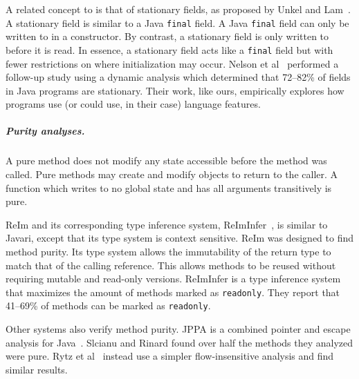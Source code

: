 A related concept to \const{} is that of stationary fields, as proposed by Unkel
and Lam~\cite{popl-2008-p183-unkel}.
A stationary field is similar to a Java \texttt{final} field.
A Java \texttt{final} field can only be written to in a constructor.
By contrast, a stationary field is only written to before it is read.
In essence, a stationary field acts like a \texttt{final} field but with fewer
restrictions on where initialization may occur.
Nelson et al~\cite{NelsonPearceNoble12ProfilingFieldInitialisationJava}
performed a follow-up study using a dynamic analysis which determined that
72--82\% of fields in Java programs are stationary.
Their work, like ours, empirically explores how programs use (or could use, in
their case) language features.

\subparagraph*{Purity analyses.}

A pure method does not modify any state accessible before the
method was called.
Pure methods may create and modify objects to return to the caller.
A function which writes to no global state and has all arguments transitively
\const{} is pure.


ReIm and its corresponding type inference system,
ReImInfer~\cite{oopsla-2012-p879-huang}, is similar to Javari, except that its
type system is context sensitive.
ReIm %
was designed to find method purity.
Its type system allows the immutability of the
return type to match that of the calling reference.
This allows methods to be reused without requiring mutable and
read-only versions.
ReImInfer is a type inference system that maximizes the amount of methods
marked as \texttt{readonly}.
They report that 41--69\% of methods can be marked as \texttt{readonly}.

Other systems also verify method purity.
JPPA is a combined pointer and escape analysis for
Java~\cite{vmcai-2005-p199-salcianu, phd-2006-salcianu}.
Slcianu and Rinard found over half the methods they analyzed were pure.
Rytz et al~\cite{ftfjp-2013-rytz} instead use a simpler flow-insensitive
analysis and find similar results.

